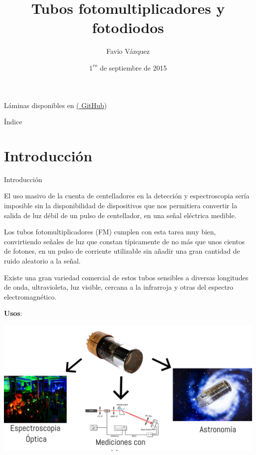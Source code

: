 \documentclass[a4paper,10pt]{beamer}
\begin{document}
\begin{frame}
\Large
\title{Tubos fotomultiplicadores y fotodiodos}
\author{Favio Vázquez}
\date{$1^{ro}$ de septiembre de 2015}

Láminas disponibles en \href{https://github.com/FavioVazquez/DeteccionRayosCosmicos-PCF}{(\color{blue} GitHub})

\maketitle
\end{frame}

\begin{frame}[allowframebreaks]{Índice}

\tableofcontents

\end{frame}

\section{Introducción}
\begin{frame}[allowframebreaks]{Introducción}
\begin{justify}
 El uso masivo de la cuenta de centelladores en la detección y espectroscopia sería 
 imposible sin la disponibilidad de dispositivos que nos permitiera convertir la 
 salida de luz débil de un pulso de centellador, en una señal eléctrica medible. 
 
 \vspace{.3cm}
 
 Los tubos fotomultiplicadores (FM) cumplen con esta tarea muy bien, convirtiendo señales 
 de luz que constan típicamente de no más que unos cientos de fotones, en un pulso 
 de corriente utilizable sin añadir una gran cantidad de ruido aleatorio a la señal.
 
\framebreak

 Existe una gran variedad comercial de estos tubos sensibles a diversas longitudes de onda,
 ultravioleta, luz visible, cercana a la infrarroja y otras del espectro electromagnético.
 
 \vspace{.3cm}
 
 \textbf{Usos}:
 
 \begin{center}
   \includegraphics[scale=0.2]{fig1}
 \end{center}

 
 \end{justify}
\end{frame}
\end{document}
